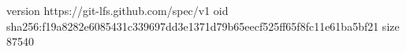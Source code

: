 version https://git-lfs.github.com/spec/v1
oid sha256:f19a8282e6085431c339697dd3e1371d79b65eecf525ff65f8fc11e61ba5bf21
size 87540
